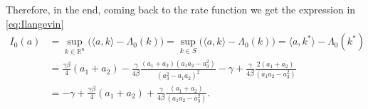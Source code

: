 \documentclass[a4paper,11pt]{article}
\numberwithin{equation}{section}
\begin{document}
Therefore, in the end, coming back to the rate function we get the expression in \eqref{eq:Ilangevin}
\begin{align}
    I_0(a) &= \sup_{k \in \mathbb{R}^n}\Big( \langle a, k \rangle - \Lambda_0(k) \Big) = \sup_{k \in S}\Big( \langle a, k \rangle - \Lambda_0(k) \Big) = \langle a, k^* \rangle - \Lambda_0(k^*) \nonumber\\
    &= \frac{\gamma\beta}{4}(a_1+a_2) - \frac{\gamma}{4\beta}\frac{(a_1+a_2)(a_1a_2- a_3^2)}{(a_3^2 - a_1 a_2)^2} -\gamma + \frac{\gamma}{4\beta} \frac{2(a_1+a_2)}{(a_1 a_2-a_3^2)} \nonumber \\
    &=-\gamma + \frac{\gamma \beta}{4}(a_1+a_2) + \frac{\gamma}{4\beta} \frac{(a_1+a_2)}{(a_1 a_2 - a_3^2)} . 
\end{align}
    
\end{document}
